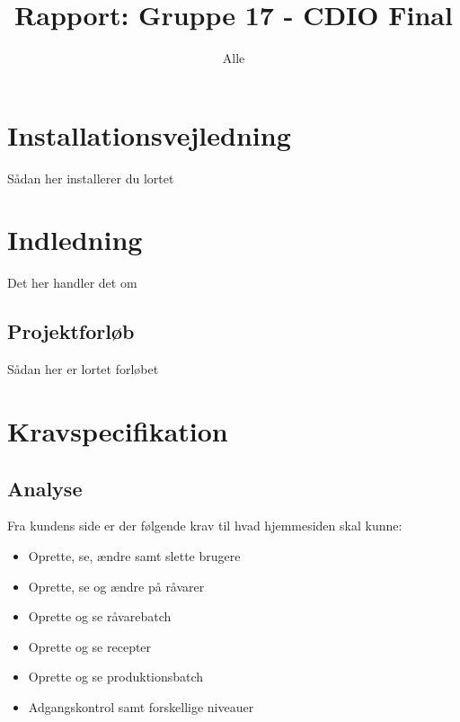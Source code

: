 \documentclass[a4paper]{article}
\title{Rapport: Gruppe 17 - CDIO Final}
\author{
  Alle
}
\begin{document}
\maketitle

\section*{Installationsvejledning} %

Sådan her installerer du lortet


\tableofcontents
\clearpage

\section{Indledning} %

Det her handler det om

\subsection{Projektforløb} %

Sådan her er lortet forløbet


\clearpage



\section{Kravspecifikation} %

\subsection{Analyse} %
Fra kundens side er der følgende krav til hvad hjemmesiden skal kunne:

\begin{itemize}
  \item Oprette, se, ændre samt slette brugere
  \item Oprette, se og ændre på råvarer
  \item Oprette og se råvarebatch 
  \item Oprette og se recepter
  \item Oprette og se produktionsbatch
  \item Adgangskontrol samt forskellige niveauer
\end{itemize}
\end{document}

